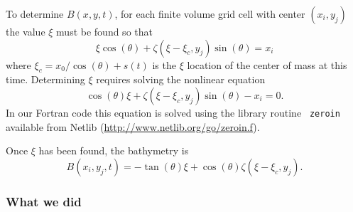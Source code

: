 To determine $B(x,y,t)$, for each finite volume grid cell with center 
$(x_i, y_j)$ the value $\xi$ must be found so that
\[
\xi\cos(\theta) + \zeta(\xi - \xi_c,y_j)\sin(\theta) = x_i
\]
where $\xi_c = x_0/\cos(\theta) + s(t)$  is the $\xi$ location of the center
of mass at this time.
Determining $\xi$ requires solving the nonlinear equation
\[
\cos(\theta)\xi + \zeta(\xi - \xi_c, y_j) \sin(\theta) - x_i = 0.
\]
In our Fortran code this equation is solved using the library routine {\tt
zeroin} available from Netlib (\url{http://www.netlib.org/go/zeroin.f}).

Once $\xi$ has been found, the bathymetry is 
\[
B(x_i,y_j,t) =
-\tan(\theta)\xi + \cos(\theta)\zeta(\xi - \xi_c, y_j).
\]


\subsubsection{What we did}\label{sec:bp3what}


